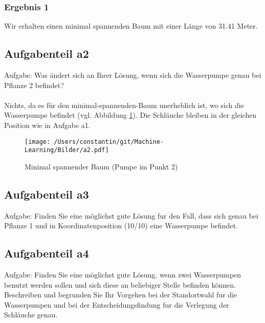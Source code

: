 \documentclass[12pt,titlepage]{article}
\numberwithin{equation}{section}
\begin{document}
\subsubsection*{Ergebnis 1}

Wir erhalten einen minimal spannenden Baum mit einer Länge von 31.41 Meter.

\subsection{Aufgabenteil a2}
Aufgabe: Was ändert sich an Ihrer Lösung, wenn sich die Wasserpumpe genau bei Pflanze 2 befindet?
\\ \\
 \noindent Nichts, da es für den minimal-spannenden-Baum unerheblich ist, wo sich die Wasserpumpe befindet (vgl. Abbildung \ref{fig:a2}). 
Die Schläuche bleiben in der gleichen Position wie in Aufgabe a1.

\begin{figure}[H]
	\centering
	\texttt{[image: /Users/constantin/git/Machine-Learning/Bilder/a2.pdf]}
	\caption{Minimal spannender Baum (Pumpe im Punkt 2) }
	\label{fig:a2}
\end{figure}

\subsection{Aufgabenteil a3}
Aufgabe: Finden Sie eine möglichst gute Lösung fur den Fall, dass sich genau bei Pflanze 1 und in Koordinatenposition (10/10) eine Wasserpumpe befindet.











\subsection{Aufgabenteil a4}
Aufgabe: Finden Sie eine möglichst gute Lösung, wenn zwei Wasserpumpen benutzt werden sollen
und sich diese an beliebiger Stelle befinden können. Beschreiben und begrunden Sie Ihr
Vorgehen bei der Standortwahl fur die Wasserpumpen und bei der Entscheidungsfindung
fur die Verlegung der Schläuche genau.
\end{document}
